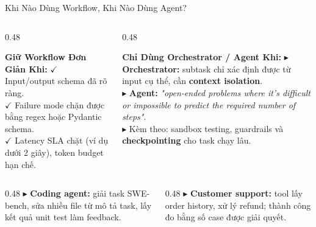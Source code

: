 \documentclass[aspectratio=1610,10pt,xcolor={table}]{beamer}
\begin{document}
\begin{frame}{Khi Nào Dùng Workflow, Khi Nào Dùng Agent?}
  \vspace{0.1cm}
  \begin{columns}[t]
    \begin{column}{0.48\textwidth}
      \begin{block}{\textbf{Giữ Workflow Đơn Giản Khi:}}
        \scriptsize
        $\checkmark$ Input/output schema đã rõ ràng.\\
        $\checkmark$ Failure mode chặn được bằng regex hoặc Pydantic schema.\\
        $\checkmark$ Latency SLA chặt (ví dụ dưới 2 giây), token budget hạn chế.
      \end{block}
    \end{column}
    \begin{column}{0.48\textwidth}
      \begin{alertblock}{\textbf{Chỉ Dùng Orchestrator / Agent Khi:}}
        \scriptsize
        $\blacktriangleright$ \textbf{Orchestrator:} subtask chỉ xác định được từ input cụ thể, cần \textbf{context isolation}.\\
        $\blacktriangleright$ \textbf{Agent:} \textit{"open-ended problems where it's difficult or impossible to predict the required number of steps"}.\\
        $\blacktriangleright$ Kèm theo: sandbox testing, guardrails và \textbf{checkpointing} cho task chạy lâu.
      \end{alertblock}
    \end{column}
  \end{columns}

  \vspace{0.05cm}
  \begin{tcolorbox}[usecase,title={Agent Use Case (Anthropic): vừa hội thoại vừa hành động, tiêu chí thành công rõ, có feedback loop}]
    \scriptsize
    \begin{columns}[t]
      \begin{column}{0.48\textwidth}
        $\blacktriangleright$ \textbf{Coding agent:} giải task SWE-bench, sửa nhiều file từ mô tả task, lấy kết quả unit test làm feedback.
      \end{column}
      \begin{column}{0.48\textwidth}
        $\blacktriangleright$ \textbf{Customer support:} tool lấy order history, xử lý refund; thành công đo bằng số case được giải quyết.
      \end{column}
    \end{columns}
  \end{tcolorbox}
\end{frame}
\end{document}

